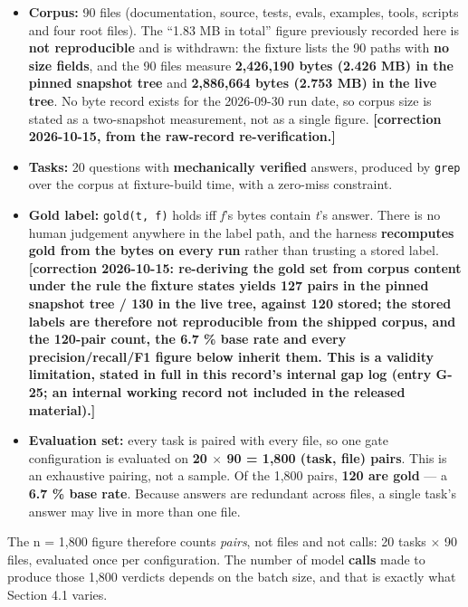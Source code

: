 \documentclass[10pt]{article}
\begin{document}
\begin{itemize}
\item \textbf{Corpus:} 90 files (documentation, source, tests, evals, examples, tools, scripts and four root files). The ``1.83 MB in total'' figure previously recorded here is \textbf{not reproducible} and is withdrawn: the fixture lists the 90 paths with \textbf{no size fields}, and the 90 files measure \textbf{2,426,190 bytes (2.426 MB) in the pinned snapshot tree} and \textbf{2,886,664 bytes (2.753 MB) in the live tree}. No byte record exists for the 2026-09-30 run date, so corpus size is stated as a two-snapshot measurement, not as a single figure. \textbf{[correction 2026-10-15, from the raw-record re-verification.]}
\item \textbf{Tasks:} 20 questions with \textbf{mechanically verified} answers, produced by \texttt{grep} over the corpus at fixture-build time, with a zero-miss constraint.
\item \textbf{Gold label:} \texttt{gold(t, f)} holds iff \emph{f}'s bytes contain \emph{t}'s answer. There is no human judgement anywhere in the label path, and the harness \textbf{recomputes gold from the bytes on every run} rather than trusting a stored label. \textbf{[correction 2026-10-15: re-deriving the gold set from corpus content under the rule the fixture states yields 127 pairs in the pinned snapshot tree / 130 in the live tree, against 120 stored; the stored labels are therefore not reproducible from the shipped corpus, and the 120-pair count, the 6.7 \% base rate and every precision/recall/F1 figure below inherit them. This is a validity limitation, stated in full in this record's internal gap log (entry G-25; an internal working record not included in the released material).]}
\item \textbf{Evaluation set:} every task is paired with every file, so one gate configuration is evaluated on \textbf{20 $\times$ 90 = 1,800 (task, file) pairs}. This is an exhaustive pairing, not a sample. Of the 1,800 pairs, \textbf{120 are gold} --- a \textbf{6.7 \% base rate}. Because answers are redundant across files, a single task's answer may live in more than one file.
\end{itemize}

The n = 1,800 figure therefore counts \emph{pairs}, not files and not calls: 20 tasks $\times$ 90 files, evaluated once per configuration. The number of model \textbf{calls} made to produce those 1,800 verdicts depends on the batch size, and that is exactly what Section 4.1 varies.
\end{document}
